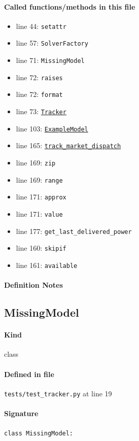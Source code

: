 \documentclass[11pt]{report}
\begin{document}
\paragraph{Called functions/methods in this file}
\begin{itemize}[leftmargin=*]
  \item line 44: \texttt{setattr}
  \item line 57: \texttt{SolverFactory}
  \item line 71: \texttt{MissingModel}
  \item line 72: \texttt{raises}
  \item line 72: \texttt{format}
  \item line 73: \hyperref[def:tracker.py:Tracker:L19]{\texttt{Tracker}}
  \item line 103: \hyperref[def:tests-util.py:ExampleModel:L25]{\texttt{ExampleModel}}
  \item line 165: \hyperref[def:tracker.py:Tracker.track_market_dispatch:L283]{\texttt{track\_market\_dispatch}}
  \item line 169: \texttt{zip}
  \item line 169: \texttt{range}
  \item line 171: \texttt{approx}
  \item line 171: \texttt{value}
  \item line 177: \texttt{get\_last\_delivered\_power}
  \item line 160: \texttt{skipif}
  \item line 161: \texttt{available}
\end{itemize}
\paragraph{Definition Notes}
\subsection{MissingModel}
\label{def:tests-test_tracker.py:MissingModel:L19}
\paragraph{Kind} class
\paragraph{Defined in file} \texttt{tests/test\_tracker.py} at line 19
\paragraph{Signature} \texttt{class MissingModel:}
\end{document}
